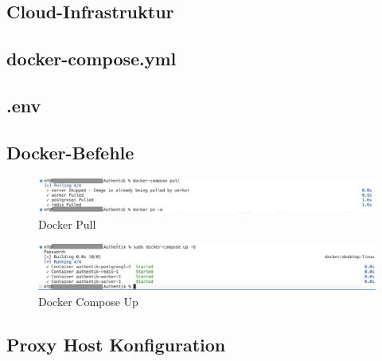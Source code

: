 \subsection{Cloud-Infrastruktur}
\label{app:Cloud-Infrastruktur}
\begin{figure}[htb]
    \centering
\end{figure}
\pagebreak

\subsection{docker-compose.yml}
\label{app:docker-compose.yml}

\subsection{.env}
\label{app:dotenv}

\subsection{Docker-Befehle}
\label{app:dockercommands}
\begin{figure}[ht]
    \centering
    \includegraphics[scale=0.4]{Bilder/Authentik-Doc/DP_00_DockerPull.png}
    \caption{Docker Pull}
  \end{figure}
  
  \vspace{0.5cm} %
  
  \begin{figure}[ht]
    \centering
    \includegraphics[scale=0.4]{Bilder/Authentik-Doc/DP_01_DockerComposeUp.png}
    \caption{Docker Compose Up}
  \end{figure}

\subsection{Proxy Host Konfiguration}
\label{app:ProxyHostConfig}

